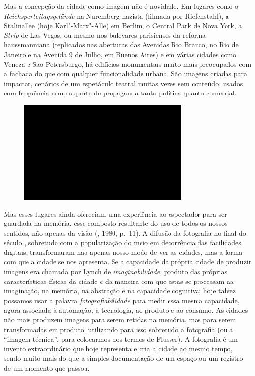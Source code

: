 Mas a concepção da cidade como imagem não é novidade. Em lugares como o
\emph{Reichsparteitagsgelände} na Nuremberg nazista (filmada por
Riefenstahl), a Stalinallee (hoje Karl"-Marx"-Alle) em Berlim, o Central
Park de Nova York, a \emph{Strip} de Las Vegas, ou mesmo nos bulevares
parisienses da reforma haussmanniana (replicados nas aberturas das
Avenidas Rio Branco, no Rio de Janeiro e na Avenida 9 de Julho, em
Buenos Aires) e em várias cidades como Veneza e São Petersburgo, há
edifícios monumentais muito mais preocupados com a fachada do que com
qualquer funcionalidade urbana. São imagens criadas para impactar,
cenários de um espetáculo teatral muitas vezes sem conteúdo, usados com
frequência como suporte de propaganda tanto política quanto comercial.

\begin{figure}[!ht]
\centering
 \includegraphics[width=85mm]{./imgs/im1.jpg}
\caption{\tiny{}}
\end{figure}

Mas esses lugares ainda ofereciam uma experiência ao espectador para ser
guardada na memória, esse composto resultante do uso de todos os nossos
sentidos, não apenas da visão (, 1980, p.~11). A difusão da
fotografia no final do século , sobretudo com a popularização do meio
em decorrência das facilidades digitais, transformaram não apenas nosso
modo de ver as cidades, mas a forma com que a cidade se nos apresenta.
Se a capacidade da própria cidade de produzir imagens era chamada por
Lynch de \emph{imaginabilidade}, produto das próprias características
físicas da cidade e da maneira com que estas se processam na imaginação,
na memória, na abstração e na capacidade cognitiva; hoje talvez possamos
usar a palavra \emph{fotografiabilidade} para medir essa mesma
capacidade, agora associada à automação, à tecnologia, ao produto e ao
consumo. As cidades não mais produzem imagens para serem retidas na
memória, mas para serem transformadas em produto, utilizando para isso
sobretudo a fotografia (ou a ``imagem técnica'', para colocarmos nos
termos de Flusser). A fotografia é um invento extraordinário que hoje
representa e cria a cidade ao mesmo tempo, sendo muito mais do que a
simples documentação de um espaço ou um registro de um momento que
passou.

